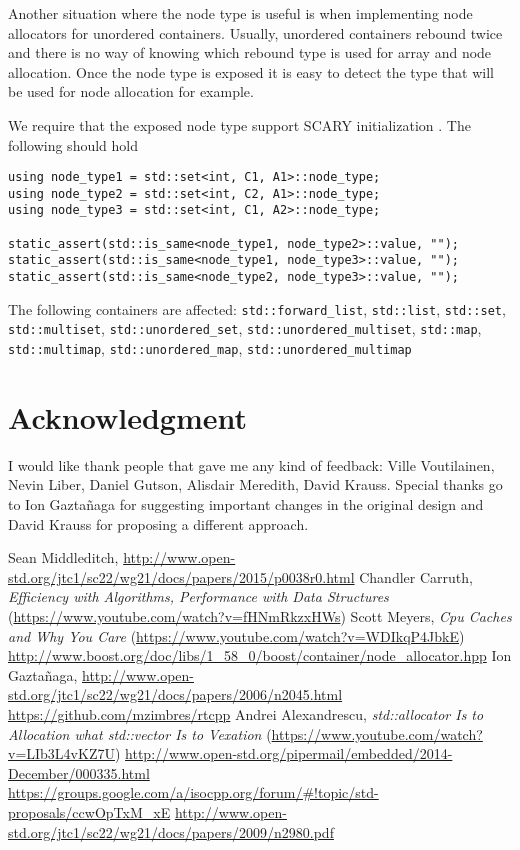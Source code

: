 \documentclass[11pt]{article}
\begin{document}
Another situation where the node type is useful is when implementing node allocators
for unordered containers. Usually, unordered containers rebound twice and there is
no way of knowing which rebound type is used for array and node allocation. Once
the node type is exposed it is easy to detect the type that will be used for node
allocation for example.

We require that the exposed node type support SCARY 
initialization \cite{scary}. The following should hold
\medskip
\begin{lstlisting}
using node_type1 = std::set<int, C1, A1>::node_type;
using node_type2 = std::set<int, C2, A1>::node_type;
using node_type3 = std::set<int, C1, A2>::node_type;

static_assert(std::is_same<node_type1, node_type2>::value, "");
static_assert(std::is_same<node_type1, node_type3>::value, "");
static_assert(std::is_same<node_type2, node_type3>::value, "");
\end{lstlisting}

The following containers are affected: \texttt{std::forward\_list},
\texttt{std::list}, \texttt{std::set}, \texttt{std::multiset},
\texttt{std::unordered\_set}, \texttt{std::unordered\_multiset},
\texttt{std::map}, \texttt{std::multimap},
\texttt{std::unordered\_map}, \texttt{std::unordered\_multimap}

\section{Acknowledgment}

I would like thank people that gave me any kind of feedback: Ville Voutilainen,
Nevin Liber, Daniel Gutson, Alisdair Meredith, David Krauss. Special thanks go
to Ion Gaztañaga for suggesting important changes in the original design and David 
Krauss for proposing a different approach.

\begin{thebibliography}{9}

   Sean Middleditch, \url{http://www.open-std.org/jtc1/sc22/wg21/docs/papers/2015/p0038r0.html}
   Chandler Carruth, {\it Efficiency with Algorithms, Performance
  with Data Structures} (\url{https://www.youtube.com/watch?v=fHNmRkzxHWs})
   Scott Meyers, {\it Cpu Caches and Why You Care} (\url{https://www.youtube.com/watch?v=WDIkqP4JbkE})
   \url{http://www.boost.org/doc/libs/1_58_0/boost/container/node_allocator.hpp}
   Ion Gazta\~ naga, \url{http://www.open-std.org/jtc1/sc22/wg21/docs/papers/2006/n2045.html}
   \url{https://github.com/mzimbres/rtcpp}
   Andrei Alexandrescu, {\it std::allocator Is to Allocation what
  std::vector Is to Vexation} (\url{https://www.youtube.com/watch?v=LIb3L4vKZ7U})
   \url{http://www.open-std.org/pipermail/embedded/2014-December/000335.html}
   \url{https://groups.google.com/a/isocpp.org/forum/#!topic/std-proposals/ccwOpTxM_xE}
   \url{http://www.open-std.org/jtc1/sc22/wg21/docs/papers/2009/n2980.pdf}

\end{thebibliography}
\end{document}
